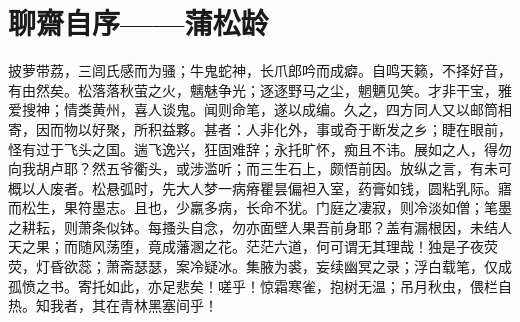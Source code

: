 \section{ 聊齋自序——蒲松龄}
披萝带荔，三闾氏感而为骚；牛鬼蛇神，长爪郎吟而成癖。自鸣天籁，不择好音，有由然矣。松落落秋萤之火，魑魅争光；逐逐野马之尘，魍魉见笑。才非干宝，雅爱搜神；情类黄州，喜人谈鬼。闻则命笔，遂以成编。久之，四方同人又以邮筒相寄，因而物以好聚，所积益夥。甚者：人非化外，事或奇于断发之乡；睫在眼前，怪有过于飞头之国。遄飞逸兴，狂固难辞；永托旷怀，痴且不讳。展如之人，得勿向我胡卢耶？然五爷衢头，或涉滥听；而三生石上，颇悟前因。放纵之言，有未可概以人废者。松悬弧时，先大人梦一病瘠瞿昙偏袒入室，药膏如钱，圆粘乳际。寤而松生，果符墨志。且也，少羸多病，长命不犹。门庭之凄寂，则冷淡如僧；笔墨之耕耘，则萧条似钵。每搔头自念，勿亦面壁人果吾前身耶？盖有漏根因，未结人天之果；而随风荡堕，竟成藩溷之花。茫茫六道，何可谓无其理哉！独是子夜荧荧，灯昏欲蕊；萧斋瑟瑟，案冷疑冰。集腋为裘，妄续幽冥之录；浮白载笔，仅成孤愤之书。寄托如此，亦足悲矣！嗟乎！惊霜寒雀，抱树无温；吊月秋虫，偎栏自热。知我者，其在青林黑塞间乎！